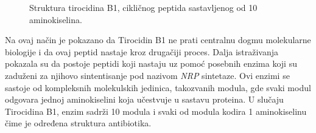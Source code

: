 \documentclass[12pt,oneside]{memoir}
\begin{document}
\begin{figure}[h]
  \centering
  
  \caption{Struktura tirocidina B1, cikličnog peptida sastavljenog od 10 aminokiselina.}
  \label{fig:tirocidin}
\end{figure}

Na ovaj način je pokazano da Tirocidin B1 ne prati centralnu dogmu molekularne biologije i da ovaj peptid nastaje kroz drugačiji proces. Dalja istraživanja pokazala su da postoje peptidi koji nastaju uz pomoć posebnih enzima koji su zaduženi za njihovo sintentisanje pod nazivom \emph{NRP} sintetaze. Ovi enzimi se sastoje od kompleksnih molekulskih jedinica, takozvanih modula, gde svaki modul odgovara jednoj aminokiselini koja učestvuje u sastavu proteina. U slučaju Tirocidina B1, enzim sadrži 10 modula i svaki od modula kodira 1 aminokiselinu čime je određena struktura antibiotika.
\end{document}
